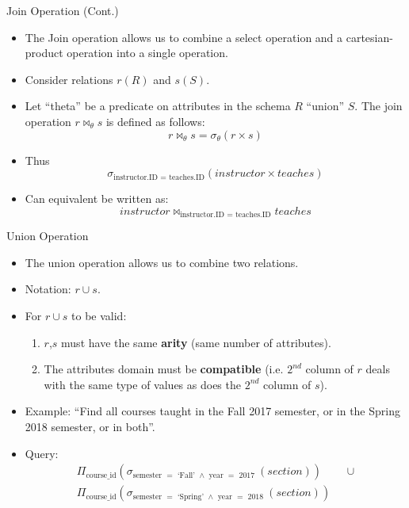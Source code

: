 \documentclass{beamer}
\begin{document}
\begin{frame}{Join Operation (Cont.)}
    \begin{itemize}
        \item The Join operation allows us to combine a select operation and a cartesian-product operation into a single operation.
        \item Consider relations $r(R)$ and $s(S)$.
        \item Let ``theta'' be a predicate on attributes in the schema $R$ ``union'' $S$.  The join operation $r \Join_\theta s$ is defined as follows:
        {\Large
            $$
                r \Join_\theta s = \sigma_\theta (r \times s)
            $$
        }
        \item Thus
        {\Large
            $$
                \sigma_{\text{instructor.ID } = \text{ teaches.ID}}( instructor \times teaches )
            $$
        }
        \item Can equivalent be written as:
        {\Large
            $$
                instructor \Join_{\text{instructor.ID } = \text{ teaches.ID}} teaches 
            $$
        }
    \end{itemize}
\end{frame}

\begin{frame}{Union Operation}
    \begin{itemize}
        \item The union operation allows us to combine two relations.
        \item Notation: {\Large $r \cup s$}.
        \item For $r \cup s$ to be valid:
        \begin{enumerate}
            \item $r$,$s$ must have the same \textbf{arity} (same number of attributes).
            \item The attributes domain must be \textbf{compatible} (i.e. $2^{nd}$ column of $r$ deals with the same type of values as does the $2^{nd}$ column of $s$).
        \end{enumerate}
        \item Example: ``Find all courses taught in the Fall 2017 semester, or in the Spring 2018 semester, or in both''.
        \item Query:
        \begin{equation*}
            \begin{split}
                \Pi_{\text{course\_id}} (\sigma_{ \text{semester } = \text{ `Fall' } \wedge \text{ year } = \text{ 2017 } } (section) ) & \text{ } \cup \\
                \Pi_{\text{course\_id}} (\sigma_{ \text{semester } = \text{ `Spring' } \wedge \text{ year } = \text{ 2018 } } (section) ) & \\
            \end{split}
        \end{equation*}
    \end{itemize}
\end{frame}
\end{document}
